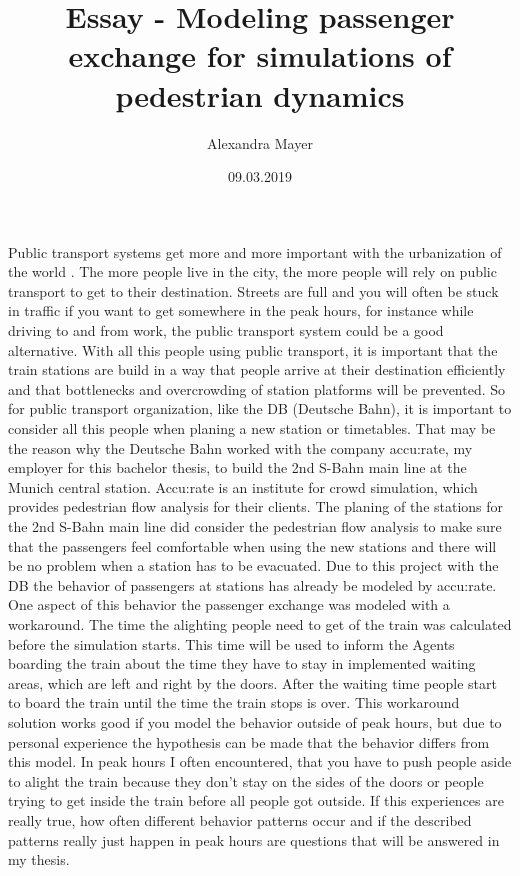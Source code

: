 \documentclass[a4paper, 12pt]{scrartcl}
\title{Essay - Modeling passenger exchange for simulations of pedestrian dynamics }
\author{Alexandra Mayer}
\date{09.03.2019}
\begin{document}
\maketitle
Public transport systems get more and more important with the urbanization of the world . The more people live in the city, the more people will rely on public transport to get to their destination. Streets are full and you will often be stuck in traffic if you want to get somewhere in the peak hours, for instance while driving to and from work, the public transport system could be a good alternative. With all this people using public transport, it is important that the train stations are build in a way that people arrive at their destination efficiently and that bottlenecks and overcrowding of station platforms will be prevented.\newline
So for public transport organization, like the DB (Deutsche Bahn), it is important to consider all this people when planing a new station or timetables. That may be the reason why the Deutsche Bahn worked with the company accu:rate, my employer for this bachelor thesis, to build the 2nd S-Bahn main line at the Munich central station. Accu:rate is an institute for crowd simulation, which provides pedestrian flow analysis for their clients. The planing of the stations for the 2nd S-Bahn main line did consider the pedestrian flow analysis to make sure that the passengers feel comfortable when using the new stations and there will be no problem when a station has to be evacuated. 
\newline
Due to this project with the DB the behavior of passengers at stations has already be modeled by accu:rate. One aspect of this behavior the passenger exchange was modeled with a workaround. The time the alighting people need to get of the train was calculated before the simulation starts. This time will be used to inform the Agents boarding the train about the time they have to stay in implemented waiting areas, which are left and right by the doors. After the waiting time people start to board the train until the time the train stops is over.
\newline
This workaround solution works good if you model the behavior outside of peak hours, but due to personal experience the hypothesis can be made that the behavior differs from this model. In peak hours I often encountered, that you have to push people aside to alight the train because they don't stay on the sides of the doors or people trying to get inside the train before all people got outside. If this experiences are really true, how often different behavior patterns occur and if the described patterns really just happen in peak hours are questions that will be answered in my thesis. 
\end{document}
